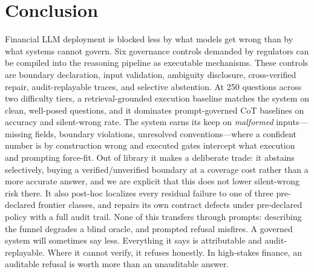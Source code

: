 \section{Conclusion}
Financial LLM deployment is blocked less by what models get wrong than by what systems cannot govern.
Six governance controls demanded by regulators can be compiled into the reasoning pipeline as executable mechanisms.
These controls are boundary declaration, input validation, ambiguity disclosure, cross-verified repair, audit-replayable traces, and selective abstention.
At 250 questions across two difficulty tiers, a retrieval-grounded execution baseline matches the system on clean, well-posed questions, and it dominates prompt-governed CoT baselines on accuracy and silent-wrong rate.
The system earns its keep on \emph{malformed} inputs---missing fields, boundary violations, unresolved conventions---where a confident number is by construction wrong and executed gates intercept what execution and prompting force-fit.
Out of library it makes a deliberate trade: it abstains selectively, buying a verified/unverified boundary at a coverage cost rather than a more accurate answer, and we are explicit that this does not lower silent-wrong risk there.
It also post-hoc localizes every residual failure to one of three pre-declared frontier classes, and repairs its own contract defects under pre-declared policy with a full audit trail.
None of this transfers through prompts: describing the funnel degrades a blind oracle, and prompted refusal misfires.
A governed system will sometimes say less.
Everything it says is attributable and audit-replayable.
Where it cannot verify, it refuses honestly.
In high-stakes finance, an auditable refusal is worth more than an unauditable answer.
